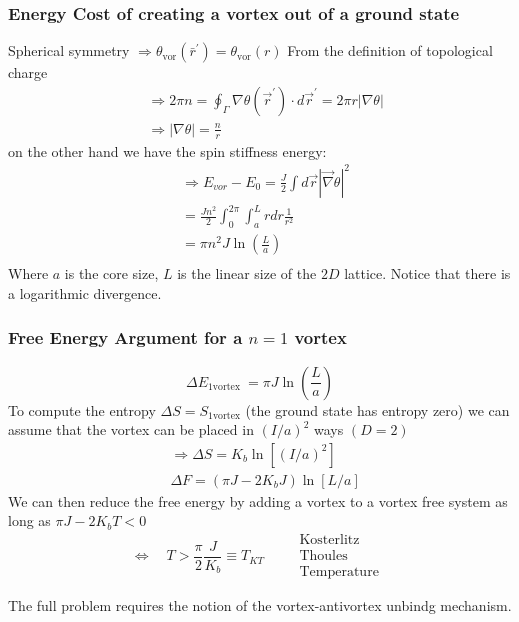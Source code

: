 \documentclass[../../Main/Main.tex]{subfiles}
\begin{document}
\subsubsection{Energy Cost of creating a vortex out of a ground state}

Spherical symmetry $\Rightarrow \theta_{\text {vor}}\left(\bar{r}^{\prime}\right)=\theta_{\text {vor}}(r)$
From the definition of topological charge
$$\begin{aligned}
& \Rightarrow 2 \pi n=\oint_{\Gamma} \nabla \theta\left(\vec{r}^{\prime}\right) \cdot d \vec{r}^{\prime}=2 \pi r|\nabla \theta| \\
& \Rightarrow|\nabla \theta|=\frac{n}{r}
\end{aligned}$$
on the other hand we have the spin stiffness energy:
$$\begin{aligned}
& \Rightarrow E_{vor}-E_0=\frac{J}{2} \int d \vec{r}|\vec{\nabla} \theta|^2 \\
& =\frac{J n^2}{2} \int_0^{2 \pi} \int_a^L r d r \frac{1}{r^2} \\
& =\pi n^2 J \ln \left( \frac{L}{a} \right) \\
&
\end{aligned}$$
Where $a$ is the core size, $L$ is the linear size of the $2D$ lattice. Notice that there is a logarithmic divergence.

\subsubsection{Free Energy Argument for a $n = 1$ vortex}
$$\Delta E_{\text {1vortex }}=\pi J \ln \left( \frac{L}{a} \right)$$
To compute the entropy $\Delta S=S_{1 \text {vortex}}$ (the ground state has entropy zero) we can assume that the vortex can be placed in $(I / a)^2$ ways $(D=2)$
$$\begin{aligned}
& \Rightarrow \Delta S=K_b \ln \left[(I / a)^2\right] \\
& \Delta F=\left(\pi J-2 K_b J\right) \ln [L / a]
\end{aligned}$$
We can then reduce the free energy by adding a vortex to a vortex free system as long as $\pi J-2 K_b T<0$
$$\Leftrightarrow \quad T>\frac{\pi}{2} \frac{J}{K_b} \equiv T_{K T} \quad \begin{aligned}
& \text { Kosterlitz } \\
& \text { Thoules } \\
& \text { Temperature }
\end{aligned}$$

The full problem requires the notion of  the vortex-antivortex unbindg mechanism.
\end{document}

